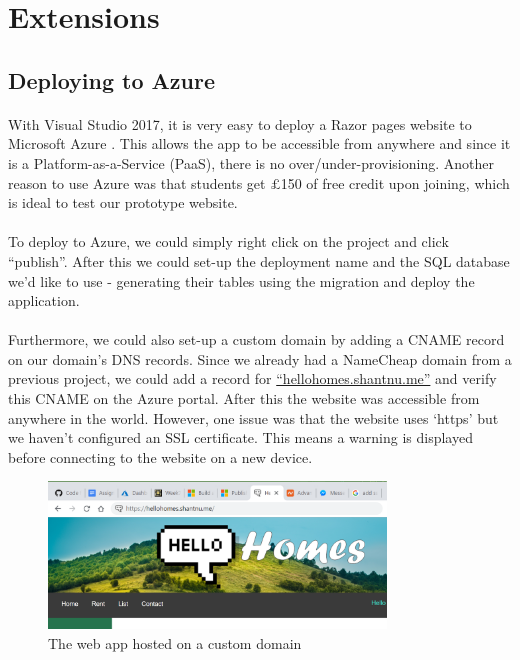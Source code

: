 \documentclass{article}
\begin{document}
\FloatBarrier
\section{Extensions}
    \subsection{Deploying to Azure}
        \paragraph{}
            With Visual Studio 2017, it is very easy to deploy a Razor pages website to Microsoft Azure \cite{azure_tutorial}.
            This allows the app to be accessible from anywhere and since it is a Platform-as-a-Service (PaaS), there is no over/under-provisioning.
            Another reason to use Azure was that students get $\pounds$150 of free credit upon joining, which is ideal to test our prototype website.

        \paragraph{}
            To deploy to Azure, we could simply right click on the project and click ``publish''.
            After this we could set-up the deployment name and the SQL database we'd like to use - generating their tables using the migration and deploy the application.

        \paragraph{}
            Furthermore, we could also set-up a custom domain by adding a CNAME record on our domain’s DNS records.
            Since we already had a NameCheap domain from a previous project, we could add a record for \href{https://hellohomes.shantnu.me/}{``hellohomes.shantnu.me''} and verify this CNAME on the Azure portal.
            After this the website was accessible from anywhere in the world.
            However, one issue was that the website uses `https' but we haven't configured an SSL certificate.
            This means a warning is displayed before connecting to the website on a new device.

            \begin{figure}[!htb]
                \centering
                \includegraphics[width=0.8\textwidth]{figures/custom_domain.png}
                \caption[Custom Domain]{The web app hosted on a custom domain}
                \label{fig:custom_domain}
            \end{figure}
\end{document}
